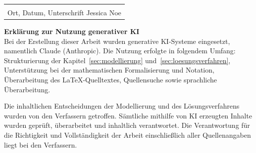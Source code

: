 \documentclass[12pt, a4paper]{article}
\newcommand{\ArbeitAutorZwei}{Jessica Noe}
\begin{document}
\vspace{3em}

\begin{tabular}{@{}p{7cm}@{}}
  \dotfill \\
  Ort, Datum, Unterschrift \ArbeitAutorZwei
\end{tabular}

\vspace{2em}

{\large\bfseries Erklärung zur Nutzung generativer KI}\\[1em]

Bei der Erstellung dieser Arbeit wurden generative KI-Systeme eingesetzt, namentlich
Claude (Anthropic). Die Nutzung erfolgte in folgendem Umfang: Strukturierung der
Kapitel~\ref{sec:modellierung} und~\ref{sec:loesungsverfahren}, Unterstützung bei der
mathematischen Formalisierung und Notation, Überarbeitung des
LaTeX-Quelltextes, Quellensuche sowie sprachliche Überarbeitung.

Die inhaltlichen Entscheidungen der Modellierung und des Lösungsverfahrens wurden von
den Verfassern getroffen. Sämtliche mithilfe von KI erzeugten Inhalte wurden geprüft,
überarbeitet und inhaltlich verantwortet. Die Verantwortung für die Richtigkeit und
Vollständigkeit der Arbeit einschließlich aller Quellenangaben liegt bei den
Verfassern.

\newpage
{}

\tableofcontents

\newpage
\listoftables
{}

\setcounter{romanpages}{\value{page}}

\newpage
{}








\newpage
{}
\setcounter{page}{\value{romanpages}}
\printbibliography[title={Literaturverzeichnis}, heading=bibintoc]

\newpage
\appendix

\end{document}
